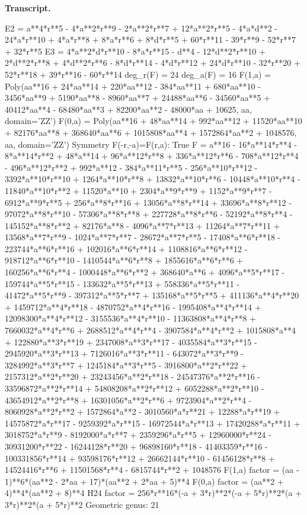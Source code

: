 \documentclass[12pt]{article}
\theoremstyle{remark}
\theoremstyle{definition}
\begin{document}
\noindent\textbf{Transcript.}
\begin{term}
E2 = a**4*r**5 - 4*a**2*r**9 - 2*a**2*r**7 + 12*a**2*r**5 - 4*a*d**2 - 24*a*r**10 + 4*a*r**8 + 8*a*r**6 + 8*d*r**5 + 60*r**11 - 39*r**9 - 52*r**7 + 32*r**5
E3 = 4*a**2*d*r**10 - 8*a*r**15 - d**4 - 12*d**2*r**10 + 2*d**2*r**8 + 4*d**2*r**6 - 8*d*r**14 - 4*d*r**12 + 24*d*r**10 - 32*r**20 + 52*r**18 + 39*r**16 - 60*r**14
deg_r(F) = 24 deg_a(F) = 16
F(1,a) = Poly(aa**16 + 24*aa**14 + 220*aa**12 - 384*aa**11 + 680*aa**10 - 3456*aa**9 + 5190*aa**8 - 8960*aa**7 + 24488*aa**6 - 34560*aa**5 + 40412*aa**4 - 68480*aa**3 + 82200*aa**2 - 48000*aa + 10625, aa, domain='ZZ')
F(0,a) = Poly(aa**16 + 48*aa**14 + 992*aa**12 + 11520*aa**10 + 82176*aa**8 + 368640*aa**6 + 1015808*aa**4 + 1572864*aa**2 + 1048576, aa, domain='ZZ')
Symmetry F(-r,-a)=F(r,a): True
F = a**16 - 16*a**14*r**4 - 8*a**14*r**2 + 48*a**14 + 96*a**12*r**8 + 336*a**12*r**6 - 708*a**12*r**4 - 496*a**12*r**2 + 992*a**12 - 384*a**11*r**5 - 256*a**10*r**12 - 3392*a**10*r**10 + 1264*a**10*r**8 + 13832*a**10*r**6 - 10448*a**10*r**4 - 11840*a**10*r**2 + 11520*a**10 + 2304*a**9*r**9 + 1152*a**9*r**7 - 6912*a**9*r**5 + 256*a**8*r**16 + 13056*a**8*r**14 + 33696*a**8*r**12 - 97072*a**8*r**10 - 57306*a**8*r**8 + 227728*a**8*r**6 - 52192*a**8*r**4 - 145152*a**8*r**2 + 82176*a**8 - 4096*a**7*r**13 + 11264*a**7*r**11 + 13568*a**7*r**9 - 1024*a**7*r**7 - 28672*a**7*r**5 - 17408*a**6*r**18 - 223744*a**6*r**16 + 102016*a**6*r**14 + 1108816*a**6*r**12 - 918712*a**6*r**10 - 1410544*a**6*r**8 + 1855616*a**6*r**6 + 160256*a**6*r**4 - 1000448*a**6*r**2 + 368640*a**6 + 4096*a**5*r**17 - 159744*a**5*r**15 - 133632*a**5*r**13 + 558336*a**5*r**11 - 41472*a**5*r**9 - 397312*a**5*r**7 + 135168*a**5*r**5 + 411136*a**4*r**20 + 1459712*a**4*r**18 - 4870752*a**4*r**16 - 1995408*a**4*r**14 + 12098300*a**4*r**12 - 3155536*a**4*r**10 - 11363808*a**4*r**8 + 7660032*a**4*r**6 + 2688512*a**4*r**4 - 3907584*a**4*r**2 + 1015808*a**4 + 122880*a**3*r**19 + 2347008*a**3*r**17 - 4035584*a**3*r**15 - 2945920*a**3*r**13 + 7126016*a**3*r**11 - 643072*a**3*r**9 - 3284992*a**3*r**7 + 1245184*a**3*r**5 - 3916800*a**2*r**22 + 2157312*a**2*r**20 + 23243456*a**2*r**18 - 24547376*a**2*r**16 - 33596872*a**2*r**14 + 54808208*a**2*r**12 + 6052288*a**2*r**10 - 43654912*a**2*r**8 + 16301056*a**2*r**6 + 9723904*a**2*r**4 - 8060928*a**2*r**2 + 1572864*a**2 - 3010560*a*r**21 + 12288*a*r**19 + 14575872*a*r**17 - 9259392*a*r**15 - 16972544*a*r**13 + 17420288*a*r**11 + 3018752*a*r**9 - 8192000*a*r**7 + 2359296*a*r**5 + 12960000*r**24 - 30931200*r**22 - 16244128*r**20 + 96898160*r**18 - 41403359*r**16 - 100331856*r**14 + 93598176*r**12 + 26662144*r**10 - 61456128*r**8 + 14524416*r**6 + 11501568*r**4 - 6815744*r**2 + 1048576
F(1,a) factor = (aa - 1)**6*(aa**2 - 2*aa + 17)*(aa**2 + 2*aa + 5)**4
F(0,a) factor = (aa**2 + 4)**4*(aa**2 + 8)**4
H24 factor = 256*r**16*(-a + 3*r)**2*(-a + 5*r)**2*(a + 3*r)**2*(a + 5*r)**2
Geometric genus: 21
\end{term}
\end{document}

